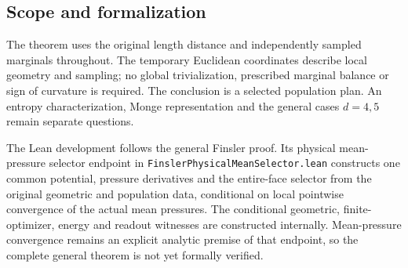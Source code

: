 \documentclass[11pt,reqno]{amsart}
\theoremstyle{definition}
\theoremstyle{remark}
\numberwithin{equation}{section}
\begin{document}
\subsection{Scope and formalization}

The theorem uses the original length distance and independently sampled
marginals throughout. The temporary Euclidean coordinates describe local
geometry and sampling; no global trivialization, prescribed marginal
balance or sign of curvature is required. The conclusion is a selected
population plan. An entropy characterization, Monge representation and
the general cases \(d=4,5\) remain separate questions.

The Lean development follows the general Finsler proof. Its physical
mean-pressure selector endpoint in
\texttt{FinslerPhysicalMeanSelector.lean} constructs one common potential,
pressure derivatives and the entire-face selector from the original
geometric and population data, conditional on local pointwise convergence
of the actual mean pressures. The conditional geometric, finite-optimizer,
energy and readout witnesses are constructed internally. Mean-pressure
convergence remains an explicit analytic premise of that endpoint, so the
complete general theorem is not yet formally verified.
\end{document}
